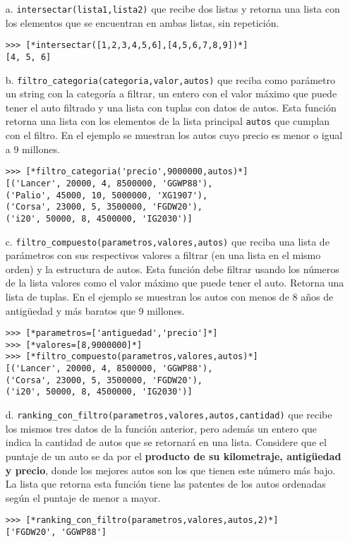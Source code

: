 \begin{itemize}
    \item[a.] \texttt{intersectar(lista1,lista2)} que recibe dos listas y retorna una lista con los elementos que se encuentran en ambas listas, sin repetición.
    
\begin{lstlisting}[style=consola]
>>> [*intersectar([1,2,3,4,5,6],[4,5,6,7,8,9])*]
[4, 5, 6]
\end{lstlisting}
    \item[b.] \texttt{filtro\_categoria(categoria,valor,autos)} que reciba como parámetro un string con la categoría a filtrar, un entero con el valor máximo que puede tener el auto filtrado y una lista con tuplas con datos de autos. Esta función retorna una lista con los elementos de la lista principal \texttt{autos} que cumplan con el filtro. En el ejemplo se muestran los autos cuyo precio es menor o igual a 9 millones.
    
\begin{lstlisting}[style=consola]
>>> [*filtro_categoria('precio',9000000,autos)*]
[('Lancer', 20000, 4, 8500000, 'GGWP88'), 
('Palio', 45000, 10, 5000000, 'XG1907'), 
('Corsa', 23000, 5, 3500000, 'FGDW20'), 
('i20', 50000, 8, 4500000, 'IG2030')]
\end{lstlisting}

    \item[c.] \texttt{filtro\_compuesto(parametros,valores,autos)} que reciba una lista de parámetros con sus respectivos valores a filtrar (en una lista en el mismo orden) y la estructura de autos. Esta función debe filtrar usando los números de la lista valores como el valor máximo que puede tener el auto. Retorna una lista de tuplas. En el ejemplo se muestran los autos con menos de 8 años de antigüedad y más baratos que 9 millones.
    
\begin{lstlisting}[style=consola]
>>> [*parametros=['antiguedad','precio']*]
>>> [*valores=[8,9000000]*]
>>> [*filtro_compuesto(parametros,valores,autos)*]
[('Lancer', 20000, 4, 8500000, 'GGWP88'), 
('Corsa', 23000, 5, 3500000, 'FGDW20'), 
('i20', 50000, 8, 4500000, 'IG2030')]
\end{lstlisting}

    \item[d.] \texttt{ranking\_con\_filtro(parametros,valores,autos,cantidad)} que recibe los mismos tres datos de la función anterior, pero además un entero que indica la cantidad de autos que se retornará en una lista. Considere que el puntaje de un auto se da por el \textbf{producto de su kilometraje, antigüedad y precio}, donde los mejores autos son los que tienen este número más bajo. La lista que retorna esta función tiene las patentes de los autos ordenadas según el puntaje de menor a mayor.

\begin{lstlisting}[style=consola]
>>> [*ranking_con_filtro(parametros,valores,autos,2)*]
['FGDW20', 'GGWP88']
\end{lstlisting}    
\end{itemize}
